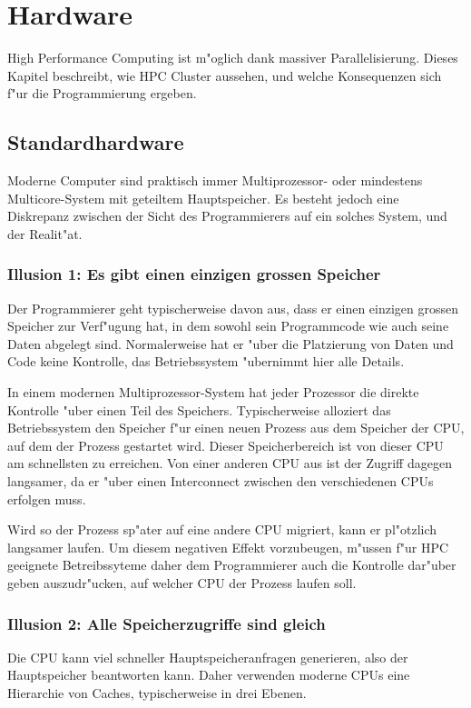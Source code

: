 \chapter{Hardware\label{chapter-hardware}}
High Performance Computing ist m"oglich dank massiver Parallelisierung.
Dieses Kapitel beschreibt, wie HPC Cluster aussehen, und welche Konsequenzen
sich f"ur die Programmierung ergeben.

\section{Standardhardware}
Moderne Computer sind praktisch immer Multiprozessor- oder mindestens
Multicore-System mit geteiltem Hauptspeicher.
Es besteht jedoch eine Diskrepanz zwischen der Sicht des Programmierers
auf ein solches System, und der Realit"at.

\subsection{Illusion 1: Es gibt einen einzigen grossen Speicher}
Der Programmierer geht typischerweise davon aus, dass er einen einzigen
grossen Speicher zur Verf"ugung hat, in dem sowohl sein Programmcode
wie auch seine Daten abgelegt sind.
Normalerweise hat er "uber die Platzierung von Daten und Code keine
Kontrolle, das Betriebssystem "ubernimmt hier alle Details.

In einem modernen Multiprozessor-System hat jeder Prozessor die direkte
Kontrolle "uber einen Teil des Speichers. Typischerweise alloziert das
Betriebssystem den Speicher f"ur einen neuen Prozess aus dem Speicher
der CPU, auf dem der Prozess gestartet wird.
Dieser Speicherbereich ist von dieser CPU am schnellsten zu erreichen.
Von einer anderen CPU aus ist der Zugriff dagegen langsamer, da er 
"uber einen Interconnect zwischen den verschiedenen CPUs erfolgen muss.

Wird so der Prozess sp"ater auf eine andere CPU migriert, kann er pl"otzlich
langsamer laufen. Um diesem negativen Effekt vorzubeugen, m"ussen
f"ur HPC geeignete Betreibssyteme daher dem Programmierer auch die
Kontrolle dar"uber geben auszudr"ucken, auf welcher CPU der Prozess laufen
soll.

\subsection{Illusion 2: Alle Speicherzugriffe sind gleich}
Die CPU kann viel schneller Hauptspeicheranfragen generieren, also der
Hauptspeicher beantworten kann.
Daher verwenden moderne CPUs eine Hierarchie von Caches, typischerweise
in drei Ebenen.

